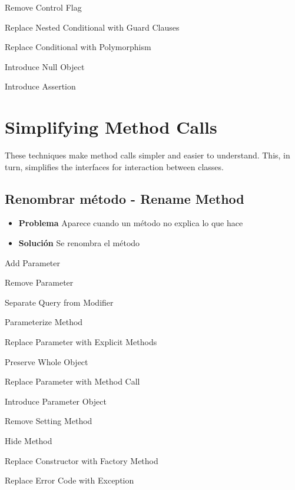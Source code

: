 \documentclass[11pt,a4paper,oneside]{book}
\begin{document}
    Remove Control Flag

    Replace Nested Conditional with Guard Clauses
    
    Replace Conditional with Polymorphism
    
    Introduce Null Object
    
    Introduce Assertion





\section{Simplifying Method Calls}

These techniques make method calls simpler and easier to understand. This, in turn, simplifies the interfaces for interaction between classes.

\subsection{Renombrar método - Rename Method}
\label{renombrarmetodo}
\begin{itemize}
    \item \textbf{Problema} Aparece cuando un método no explica lo que hace 
    \item \textbf{Solución} Se renombra el método
\end{itemize}
    
%


     
    
    Add Parameter
    
    Remove Parameter
    
    Separate Query from Modifier
    
    Parameterize Method
    
    Replace Parameter with Explicit Methods
    
    Preserve Whole Object
    
    Replace Parameter with Method Call
    
    Introduce Parameter Object
    
    Remove Setting Method
    
    Hide Method
    
    Replace Constructor with Factory Method
    
    Replace Error Code with Exception
    
\end{document}
